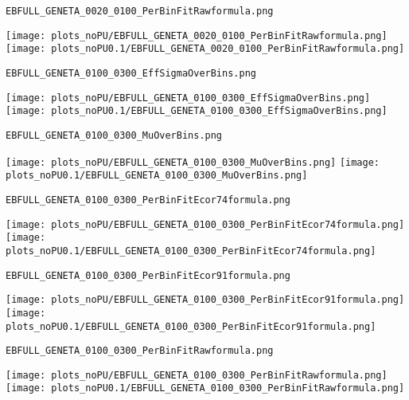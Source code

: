 \begin{frame}[fragile]
\begin{verbatim}
EBFULL_GENETA_0020_0100_PerBinFitRawformula.png
\end{verbatim}
\texttt{[image: plots\_noPU/EBFULL\_GENETA\_0020\_0100\_PerBinFitRawformula.png]}
\texttt{[image: plots\_noPU0.1/EBFULL\_GENETA\_0020\_0100\_PerBinFitRawformula.png]}
\end{frame}
\begin{frame}[fragile]
\begin{verbatim}
EBFULL_GENETA_0100_0300_EffSigmaOverBins.png
\end{verbatim}
\texttt{[image: plots\_noPU/EBFULL\_GENETA\_0100\_0300\_EffSigmaOverBins.png]}
\texttt{[image: plots\_noPU0.1/EBFULL\_GENETA\_0100\_0300\_EffSigmaOverBins.png]}
\end{frame}
\begin{frame}[fragile]
\begin{verbatim}
EBFULL_GENETA_0100_0300_MuOverBins.png
\end{verbatim}
\texttt{[image: plots\_noPU/EBFULL\_GENETA\_0100\_0300\_MuOverBins.png]}
\texttt{[image: plots\_noPU0.1/EBFULL\_GENETA\_0100\_0300\_MuOverBins.png]}
\end{frame}
\begin{frame}[fragile]
\begin{verbatim}
EBFULL_GENETA_0100_0300_PerBinFitEcor74formula.png
\end{verbatim}
\texttt{[image: plots\_noPU/EBFULL\_GENETA\_0100\_0300\_PerBinFitEcor74formula.png]}
\texttt{[image: plots\_noPU0.1/EBFULL\_GENETA\_0100\_0300\_PerBinFitEcor74formula.png]}
\end{frame}
\begin{frame}[fragile]
\begin{verbatim}
EBFULL_GENETA_0100_0300_PerBinFitEcor91formula.png
\end{verbatim}
\texttt{[image: plots\_noPU/EBFULL\_GENETA\_0100\_0300\_PerBinFitEcor91formula.png]}
\texttt{[image: plots\_noPU0.1/EBFULL\_GENETA\_0100\_0300\_PerBinFitEcor91formula.png]}
\end{frame}
\begin{frame}[fragile]
\begin{verbatim}
EBFULL_GENETA_0100_0300_PerBinFitRawformula.png
\end{verbatim}
\texttt{[image: plots\_noPU/EBFULL\_GENETA\_0100\_0300\_PerBinFitRawformula.png]}
\texttt{[image: plots\_noPU0.1/EBFULL\_GENETA\_0100\_0300\_PerBinFitRawformula.png]}
\end{frame}
